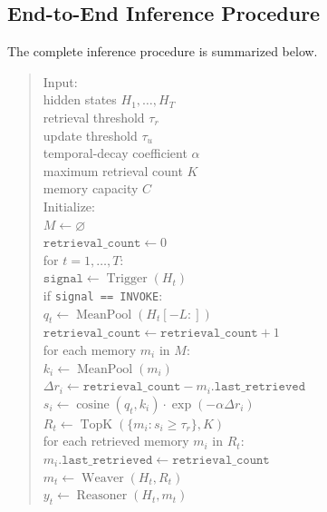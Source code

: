 \subsection{End-to-End Inference Procedure}

The complete inference procedure is summarized below.

\begin{quote}
\ttfamily
Input:\\
\quad hidden states \(H_1, \ldots, H_T\)\\
\quad retrieval threshold \(\tau_r\)\\
\quad update threshold \(\tau_u\)\\
\quad temporal-decay coefficient \(\alpha\)\\
\quad maximum retrieval count \(K\)\\
\quad memory capacity \(C\)\\
Initialize:\\
\quad \(M \leftarrow \varnothing\)\\
\quad \(\texttt{retrieval\_count} \leftarrow 0\)\\
for \(t = 1, \ldots, T\):\\
\quad \(\texttt{signal} \leftarrow \operatorname{Trigger}(H_t)\)\\
\quad if \texttt{signal == INVOKE}:\\
\qquad \(q_t \leftarrow \operatorname{MeanPool}(H_t[-L:])\)\\
\qquad \(\texttt{retrieval\_count} \leftarrow \texttt{retrieval\_count} + 1\)\\
\qquad for each memory \(m_i\) in \(M\):\\
\qquad\quad \(k_i \leftarrow \operatorname{MeanPool}(m_i)\)\\
\qquad\quad \(\Delta r_i \leftarrow \texttt{retrieval\_count} - m_i.\texttt{last\_retrieved}\)\\
\qquad\quad \(s_i \leftarrow \operatorname{cosine}(q_t, k_i) \cdot \exp(-\alpha\Delta r_i)\)\\
\qquad \(R_t \leftarrow \operatorname{TopK}(\{m_i : s_i \geq \tau_r\}, K)\)\\
\qquad for each retrieved memory \(m_i\) in \(R_t\):\\
\qquad\quad \(m_i.\texttt{last\_retrieved} \leftarrow \texttt{retrieval\_count}\)\\
\qquad \(m_t \leftarrow \operatorname{Weaver}(H_t, R_t)\)\\
\qquad \(y_t \leftarrow \operatorname{Reasoner}(H_t, m_t)\)\\

\end{quote}
